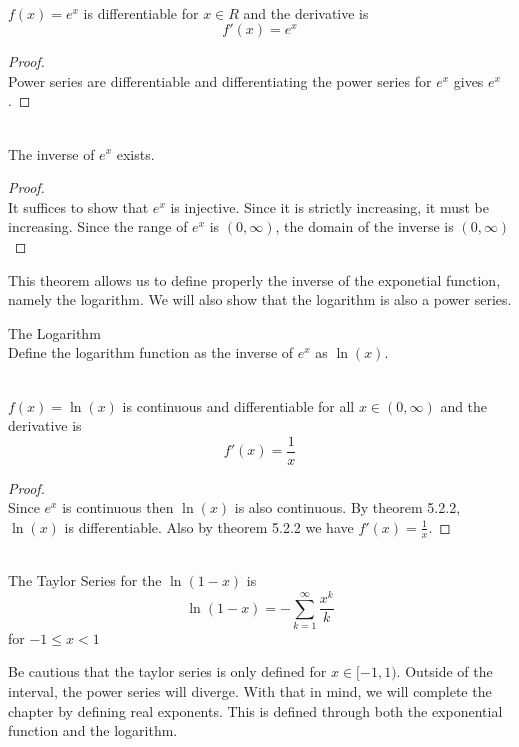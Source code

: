 \documentclass[a4paper]{article}
\begin{document}
\begin{thm}{}{}\\ $f(x)=e^x$ is differentiable for $x\in R$ and the derivative is $$f'(x)=e^x$$ 
\begin{proof}\\ Power series are differentiable and differentiating the power series for $e^x$ gives $e^x$. 
\end{proof}
\end{thm}

\begin{thm}{}{}\\ The inverse of $e^x$ exists. 
\begin{proof}\\ It suffices to show that $e^x$ is injective. Since it is strictly increasing, it must be increasing. Since the range of $e^x$ is $(0,\infty)$, the domain of the inverse is $(0,\infty)$
\end{proof}
\end{thm}

This theorem allows us to define properly the inverse of the exponetial function, namely the logarithm. We will also show that the logarithm is also a power series. 

\begin{defn}{The Logarithm}{}\\ Define the logarithm function as the inverse of $e^x$ as $\ln(x)$. 
\end{defn}

\begin{thm}{}{}\\ $f(x)=\ln(x)$ is continuous and differentiable for all $x\in(0,\infty)$ and the derivative is $$f'(x)=\frac{1}{x}$$ 
\begin{proof}\\ Since $e^x$ is continuous then $\ln(x)$ is also continuous. By theorem 5.2.2, $\ln(x)$ is differentiable. Also by theorem 5.2.2 we have $f'(x)=\frac{1}{x}$. 
\end{proof}
\end{thm}

\begin{thm}{}{}\\ The Taylor Series for the $\ln(1-x)$ is $$\ln(1-x)=-\sum_{k=1}^\infty\frac{x^k}{k}$$ for $-1\leq x<1$
\end{thm}

Be cautious that the taylor series is only defined for $x\in[-1,1)$. Outside of the interval, the power series will diverge. With that in mind, we will complete the chapter by defining real exponents. This is defined through both the exponential function and the logarithm. 
\end{document}
